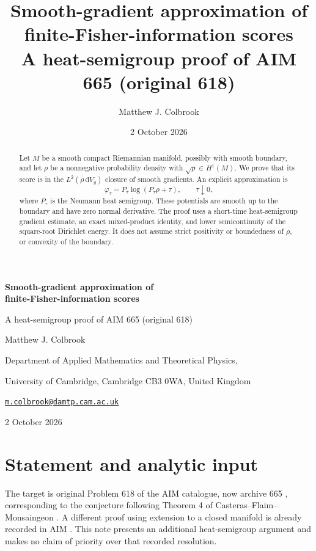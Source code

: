 \documentclass[11pt]{article}
\title{\vspace{-10mm}\textbf{Smooth-gradient approximation of\\ finite-Fisher-information scores}\\[5pt]\large A heat-semigroup proof of AIM 665 (original 618)}
\author{Matthew J. Colbrook}
\date{2 October 2026}
\begin{document}
\thispagestyle{plain}
\begin{center}
{\Large\bfseries Smooth-gradient approximation of\\[2pt]
finite-Fisher-information scores}\par
\vspace{6pt}
{\large A heat-semigroup proof of AIM 665 (original 618)}\par
\vspace{8pt}
Matthew J. Colbrook\par
{\small Department of Applied Mathematics and Theoretical Physics,\par
University of Cambridge, Cambridge CB3 0WA, United Kingdom\par
\href{mailto:m.colbrook@damtp.cam.ac.uk}{\texttt{m.colbrook@damtp.cam.ac.uk}}}\par
\vspace{8pt}
2 October 2026
\end{center}
\vspace{2pt}
\begin{abstract}
Let $M$ be a smooth compact Riemannian manifold, possibly with smooth boundary, and let $\rho$ be a nonnegative probability density with $\sqrt\rho\in H^1(M)$. We prove that its score is in the $L^2(\rho\,\mathrm{d}V_g)$ closure of smooth gradients. An explicit approximation is
\[
 \varphi_\tau=P_\tau\log(P_\tau\rho+\tau),\qquad \tau\downarrow0,
\]
where $P_\tau$ is the Neumann heat semigroup. These potentials are smooth up to the boundary and have zero normal derivative. The proof uses a short-time heat-semigroup gradient estimate, an exact mixed-product identity, and lower semicontinuity of the square-root Dirichlet energy. It does not assume strict positivity or boundedness of $\rho$, or convexity of the boundary.
\end{abstract}

\section{Statement and analytic input}
The target is original Problem 618 of the AIM catalogue, now archive 665 \cite{AIM}, corresponding to the conjecture following Theorem 4 of Casteras--Flaim--Monsaingeon \cite{CFM}. A different proof using extension to a closed manifold is already recorded in AIM \cite{Earlier}. This note presents an additional heat-semigroup argument and makes no claim of priority over that recorded resolution.
\end{document}
